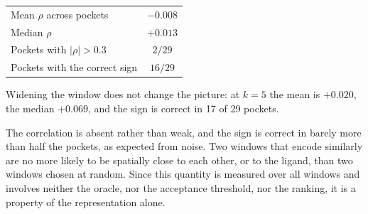 \begin{center}
\begin{tabular}{lc}
\toprule
Mean $\rho$ across pockets      & $-0.008$ \\
Median $\rho$                   & $+0.013$ \\
Pockets with $|\rho| > 0.3$     & $2/29$ \\
Pockets with the correct sign   & $16/29$ \\
\bottomrule
\end{tabular}
\end{center}

Widening the window does not change the picture: at $k=5$ the mean is $+0.020$, the
median $+0.069$, and the sign is correct in 17 of 29 pockets.

The correlation is absent rather than weak, and the sign is correct in barely more than
half the pockets, as expected from noise. Two windows that encode similarly are no more likely to be
spatially close to each other, or to the ligand, than two windows chosen at random.
Since this quantity is measured over all windows and involves neither the oracle, nor
the acceptance threshold, nor the ranking, it is a property of the representation alone.

